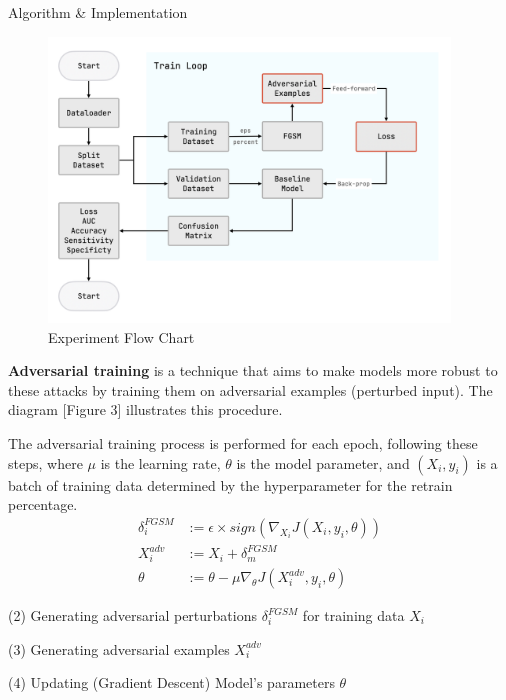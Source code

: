 \documentclass[final]{beamer}
\newlength{\colwidth}
\begin{document}
\begin{frame}[t]
\begin{columns}[t]
\begin{column}{\colwidth}
\begin{block}{Algorithm \& Implementation}
    \begin{figure}[!htp]
    \centering
    \includegraphics[width=0.95\textwidth]{diagram.png}
    \caption{\label{fig:adv}Experiment Flow Chart}
    \end{figure}

    \textbf{Adversarial training} is a technique that aims to make models more robust to these attacks by training them on adversarial examples (perturbed input). The diagram [Figure 3] illustrates this procedure. 

    The adversarial training process is performed for each epoch, following these steps, where $\mu$ is the learning rate, $\theta$ is the model parameter, and $(X_i, y_i)$ is a batch of training data determined by the hyperparameter for the retrain percentage.
    \begin{align}
        \delta_{i}^{FGSM} &:= \epsilon \times sign(\nabla_{X_i}J(X_i, y_i, \theta)) \\
        X_{i}^{adv} &:= X_i + \delta_{m}^{FGSM} \\
        \theta &:= \theta - \mu \nabla_\theta J(X_i^{adv}, y_i, \theta)
    \end{align}
    
    (2) Generating adversarial perturbations $\delta_{i}^{FGSM}$ for training data $X_i$
    
    (3) Generating adversarial examples $X_i^{adv}$
    
    (4) Updating (Gradient Descent) Model's parameters $\theta$
    


\end{block}
\end{column}
\end{columns}
\end{frame}
\end{document}

